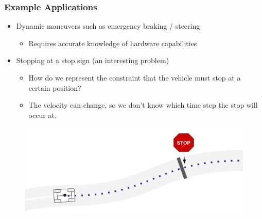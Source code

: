 \documentclass{beamer}
\begin{document}
\begin{frame}
\frametitle{Example Applications}
\begin{itemize}
	\item Dynamic maneuvers such as emergency braking / steering
	\begin{itemize}
		\item Requires accurate knowledge of hardware capabilities
	\end{itemize}
	\item Stopping at a stop sign (an interesting problem)
	\begin{itemize}
		\item How do we represent the constraint that the vehicle must stop at a certain position?
		\item The velocity can change, so we don't know which time step the stop will occur at.
	\end{itemize}
\end{itemize}
\begin{figure}
	\includegraphics[width=0.6\linewidth]{figures/stop_sign.png}
\end{figure}

\end{frame}

	

	
	
\end{document}
